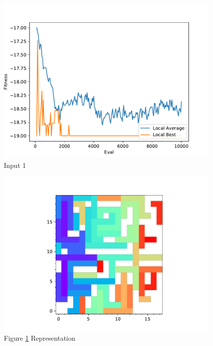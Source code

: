 \documentclass{standalone}
\begin{document}
\begin{figure}[!htb]
	\caption{Input 1}
	\label{fig:graph_1003}
	\includegraphics[width=\textwidth]{../graphs/graphs/1003.pdf}
\end{figure}


\begin{figure}[!htb]
	\caption{Figure \ref{fig:graph_1003} Representation}
	\label{fig:picture_1003}
	\includegraphics[width=\textwidth]{../graphs/picture/1003.pdf}
\end{figure}
\end{document}
